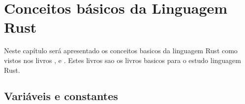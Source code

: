 

\chapter{ Conceitos b\'{a}sicos da Linguagem Rust}

Neste cap\'{i}tulo ser\'{a} apresentado os conceitos basicos da linguagem Rust como vistos nos livros \cite{Klab14}, \cite{Car15} e \cite{Car16}. Estes livros sao os livros basicos para o estudo linguagem Rust.

\section{Vari\'{a}veis e constantes}

